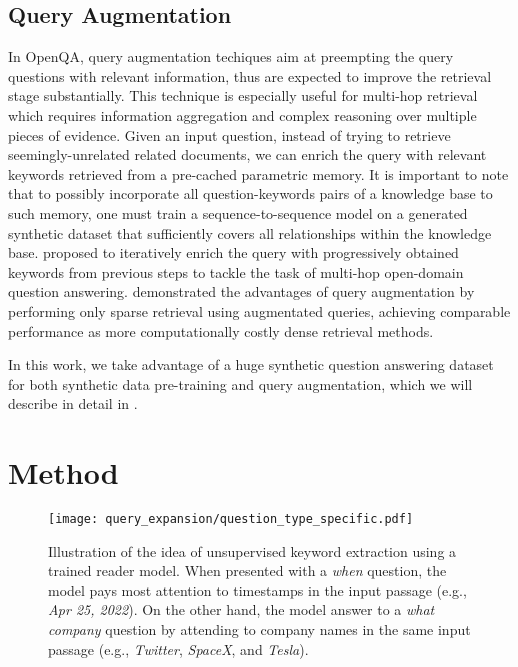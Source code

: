 \subsection{Query Augmentation}
%
In OpenQA, query augmentation techiques aim at preempting the query questions with relevant information, thus are expected to improve the retrieval stage substantially.
%
This technique is especially useful for multi-hop retrieval which requires information aggregation and complex reasoning over multiple pieces of evidence.
%
Given an input question, instead of trying to retrieve seemingly-unrelated related documents, we can enrich the query with relevant keywords retrieved from a pre-cached parametric memory.
%
It is important to note that to possibly incorporate all question-keywords pairs of a knowledge base to such memory, one must train a sequence-to-sequence model on a generated synthetic dataset that sufficiently covers all relationships within the knowledge base.
%
\citet{qi2019answering} proposed to iteratively enrich the query with progressively obtained keywords from previous steps to tackle the task of multi-hop open-domain question answering.
%
\citet{mao2021generation} demonstrated the advantages of query augmentation by performing only sparse retrieval using augmentated queries, achieving comparable performance as more computationally costly dense retrieval methods.

%
In this work, we take advantage of a huge synthetic question answering dataset for both synthetic data pre-training and query augmentation, which we will describe in detail in .



\section{Method}
\label{sec:query_expansion_method}


\begin{figure}[!htbp]
	\centering
	\texttt{[image: query\_expansion/question\_type\_specific.pdf]}
	\caption[Illustration of the idea of unsupervised keyword extraction.]{
		Illustration of the idea of unsupervised keyword extraction using a trained reader model.
	 	When presented with a \emph{when} question, the model pays most attention to timestamps in the input passage (e.g., \emph{Apr 25, 2022}).
	 	On the other hand, the model answer to a \emph{what company} question by attending to company names in the same input passage (e.g., \emph{Twitter}, \emph{SpaceX}, and \emph{Tesla}).
	}
	\label{fig:unsupervised_keyword_extraction}
\end{figure}


